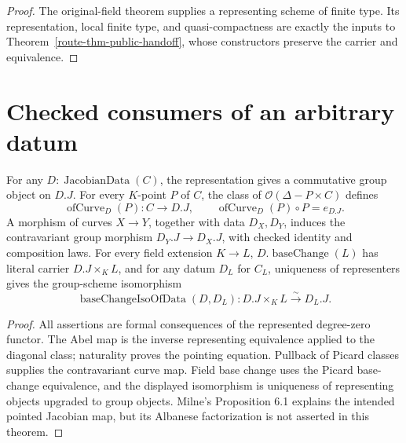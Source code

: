 \begin{proof}
  The original-field theorem supplies a representing scheme of finite
  type.  Its representation, local finite type, and quasi-compactness
  are exactly the inputs to
  Theorem~\ref{route-thm-public-handoff}, whose constructors preserve the
  carrier and equivalence.
\end{proof}

\section{Checked consumers of an arbitrary datum}

\begin{theorem}
  \label{route-thm-datum-core-consumers}
  \leanok

  For any \(D:\operatorname{JacobianData}(C)\), the representation gives a
  commutative group object on \(D.J\).  For every \(K\)-point \(P\) of \(C\),
  the class of \(\mathcal O(\Delta-P\times C)\) defines
  \[
    \operatorname{ofCurve}_D(P):C\longrightarrow D.J,
    \qquad \operatorname{ofCurve}_D(P)\circ P=e_{D.J}.
  \]
  A morphism of curves \(X\to Y\), together with data \(D_X,D_Y\), induces
  the contravariant group morphism \(D_Y.J\to D_X.J\), with checked identity
  and composition laws.  For every field extension \(K\to L\),
  \(D.\operatorname{baseChange}(L)\) has literal carrier \(D.J\times_KL\),
  and for any datum \(D_L\) for \(C_L\), uniqueness of representers gives the
  group-scheme isomorphism
  \[
    \operatorname{baseChangeIsoOfData}(D,D_L):
       D.J\times_KL\xrightarrow{\sim}D_L.J.
  \]
\end{theorem}

\begin{proof}
  All assertions are formal consequences of the represented degree-zero
  functor.  The Abel map is the inverse representing equivalence applied to
  the diagonal class; naturality proves the pointing equation.  Pullback of
  Picard classes supplies the contravariant curve map.  Field base change uses
  the Picard base-change equivalence, and the displayed isomorphism is
  uniqueness of representing objects upgraded to group objects.  Milne's
  Proposition 6.1 explains the intended pointed Jacobian map, but its Albanese
  factorization is not asserted in this theorem.
\end{proof}

